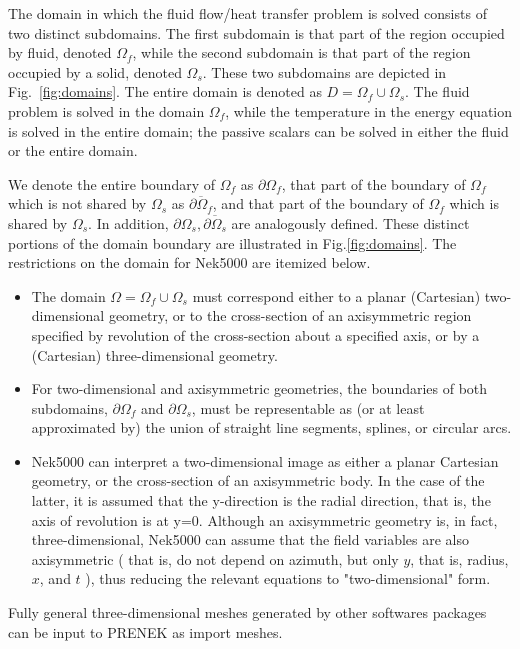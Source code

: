 The domain in which the fluid flow/heat transfer
problem is solved consists of two distinct subdomains. The
first subdomain is that part of the region occupied by
fluid, denoted $\Omega_f$, while the second subdomain is that part
of the region occupied by a solid, denoted $\Omega_s$. These two
subdomains are depicted in Fig.~\ref{fig:domains}. The entire domain is denoted as $D=\Omega_f \cup \Omega_s$.
The fluid problem is solved in the domain $\Omega_f$, while the
temperature in the energy equation is solved in the
entire domain; the passive scalars can be solved in either
the fluid or the entire domain.
  
We denote the entire boundary of $\Omega_f$ as $\partial \Omega_f$, that part
of the boundary of $\Omega_f$ which is not shared by $\Omega_s$ as
$\overline{\partial \Omega_f}$, and
that part of the boundary of $\Omega_f$ which is shared by $\Omega_s$.
In addition, $\partial \Omega_{s}, \overline{\partial \Omega_s}$ are analogously defined.
These distinct portions of the
domain boundary are illustrated in Fig.\ref{fig:domains}.
The restrictions on the domain for Nek5000 are itemized below.
\begin{itemize}
\item The domain $\Omega=\Omega_f \cup \Omega_s$ must correspond either to a
  planar (Cartesian) two-dimensional geometry, or to the
  cross-section of an axisymmetric region specified by
  revolution of the cross-section about a specified axis, or
  by a (Cartesian) three-dimensional geometry.
\item For two-dimensional and axisymmetric geometries, the
  boundaries of both subdomains, $\partial \Omega_f$ and
  $\partial \Omega_s$, must be
  representable as (or at least approximated by) the union of
  straight line segments, splines, or circular arcs.
\item Nek5000 can interpret a two-dimensional image as either
  a planar Cartesian geometry, or
  the cross-section of an axisymmetric body. In the case of
  the latter, it is assumed that the y-direction is the radial
  direction, that is, the axis of revolution is at y=0.
  Although an axisymmetric geometry is, in fact,
  three-dimensional, Nek5000 can assume that the field variables
  are also axisymmetric ( that is, do not depend on azimuth,
  but only $y$, that is, radius, $x$, and $t$ ), thus reducing the
  relevant equations to "two-dimensional" form.
\end{itemize}

Fully general three-dimensional meshes generated by other softwares
packages can be input to PRENEK as import meshes.
